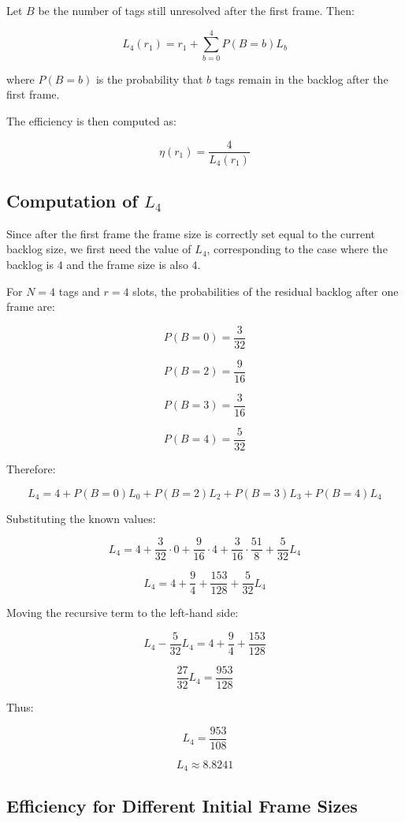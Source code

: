 \documentclass[a4paper,12pt]{article}
\begin{document}
Let \(B\) be the number of tags still unresolved after the first frame. Then:

\[
L_4(r_1) = r_1 + \sum_{b=0}^{4} P(B=b) L_b
\]

where \(P(B=b)\) is the probability that \(b\) tags remain in the backlog after the first frame.

The efficiency is then computed as:

\[
\eta(r_1)=\frac{4}{L_4(r_1)}
\]

\subsection{Computation of \(L_4\)}

Since after the first frame the frame size is correctly set equal to the current backlog size, we first need the value of \(L_4\), corresponding to the case where the backlog is \(4\) and the frame size is also \(4\).

For \(N=4\) tags and \(r=4\) slots, the probabilities of the residual backlog after one frame are:

\[
P(B=0)=\frac{3}{32}
\]

\[
P(B=2)=\frac{9}{16}
\]

\[
P(B=3)=\frac{3}{16}
\]

\[
P(B=4)=\frac{5}{32}
\]

Therefore:

\[
L_4 = 4 + P(B=0)L_0 + P(B=2)L_2 + P(B=3)L_3 + P(B=4)L_4
\]

Substituting the known values:

\[
L_4 =
4
+
\frac{3}{32} \cdot 0
+
\frac{9}{16} \cdot 4
+
\frac{3}{16} \cdot \frac{51}{8}
+
\frac{5}{32} L_4
\]

\[
L_4 =
4
+
\frac{9}{4}
+
\frac{153}{128}
+
\frac{5}{32}L_4
\]

Moving the recursive term to the left-hand side:

\[
L_4 - \frac{5}{32}L_4 =
4
+
\frac{9}{4}
+
\frac{153}{128}
\]

\[
\frac{27}{32}L_4 =
\frac{953}{128}
\]

Thus:

\[
L_4 =
\frac{953}{108}
\]

\[
L_4 \approx 8.8241
\]

\subsection{Efficiency for Different Initial Frame Sizes}
\end{document}
